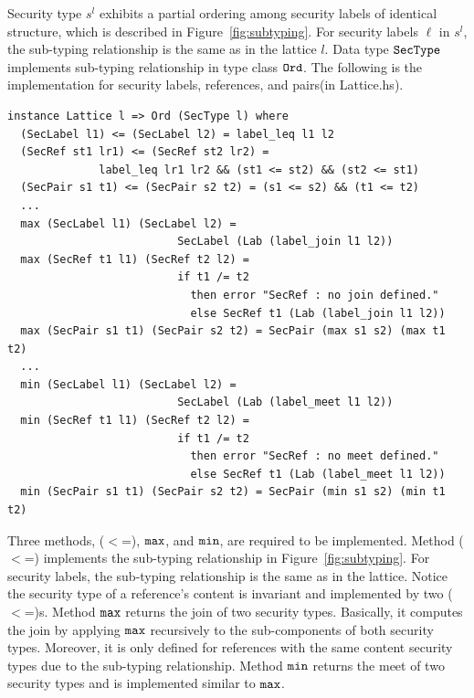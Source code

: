 \documentclass[a4paper]{report}
\newcommand{\co}[1]{$\cod{#1}$}
\newcommand{\st}{s^l}
\begin{document}
Security type $\st$ exhibits a partial ordering among security labels of identical
structure, which is described in Figure~\ref{fig:subtyping}.
For security labels $\ell$ in $\st$, the sub-typing relationship is the same as in the lattice $l$.
Data type $\mathtt{SecType}$ implements sub-typing relationship in type class \co{Ord}.
The following is the implementation for security labels, references, and pairs(in Lattice.hs).
\begin{Verbatim}[fontsize=\footnotesize]
instance Lattice l => Ord (SecType l) where
  (SecLabel l1) <= (SecLabel l2) = label_leq l1 l2
  (SecRef st1 lr1) <= (SecRef st2 lr2) = 
              label_leq lr1 lr2 && (st1 <= st2) && (st2 <= st1)
  (SecPair s1 t1) <= (SecPair s2 t2) = (s1 <= s2) && (t1 <= t2)
  ...
  max (SecLabel l1) (SecLabel l2) = 
                          SecLabel (Lab (label_join l1 l2))
  max (SecRef t1 l1) (SecRef t2 l2) = 
                          if t1 /= t2
                            then error "SecRef : no join defined."
                            else SecRef t1 (Lab (label_join l1 l2))
  max (SecPair s1 t1) (SecPair s2 t2) = SecPair (max s1 s2) (max t1 t2)
  ...
  min (SecLabel l1) (SecLabel l2) = 
                          SecLabel (Lab (label_meet l1 l2))
  min (SecRef t1 l1) (SecRef t2 l2) = 
                          if t1 /= t2
                            then error "SecRef : no meet defined."
                            else SecRef t1 (Lab (label_meet l1 l2))
  min (SecPair s1 t1) (SecPair s2 t2) = SecPair (min s1 s2) (min t1 t2)
\end{Verbatim} 
Three methods, ($<$=), \co{max}, and \co{min}, are required to be implemented.
Method ($<$=) implements the sub-typing relationship in Figure~\ref{fig:subtyping}.
For security labels, the sub-typing relationship is the same as in the lattice.
Notice the security type of a reference's content is invariant and implemented by two ($<$=)s.
%
Method \co{max} returns the join of two security types.
Basically, it computes the join by applying \co{max} recursively to the sub-components of 
both security types. Moreover, it is only defined for references with the same content security types
due to the sub-typing relationship.
Method \co{min} returns the meet of two security types and is implemented similar to \co{max}.
\end{document}
